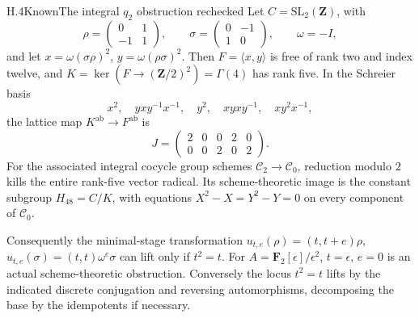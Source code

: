 \begin{statement}{H.4}{Known}{The integral $q_2$ obstruction rechecked}
Let $C=\mathrm{SL}_2(\mathbf Z)$, with
\[
 \rho=\begin{pmatrix}0&1\\-1&1\end{pmatrix},\qquad
 \sigma=\begin{pmatrix}0&-1\\1&0\end{pmatrix},\qquad
 \omega=-I,
\]
and let $x=\omega(\sigma\rho)^2$, $y=\omega(\rho\sigma)^2$.
Then $F=\langle x,y\rangle$ is free of rank two and index twelve,
and $K=\ker(F\to(\mathbf Z/2)^2)=\Gamma(4)$ has rank five.
In the Schreier basis
\[
 x^2,\quad yxy^{-1}x^{-1},\quad y^2,\quad
 xyxy^{-1},\quad xy^2x^{-1},
\]
the lattice map $K^{\mathrm{ab}}\to F^{\mathrm{ab}}$ is
\[
       J=\begin{pmatrix}2&0&0&2&0\\0&0&2&0&2\end{pmatrix}.
\]
For the associated integral cocycle group schemes
$\mathscr C_2\to\mathscr C_0$, reduction modulo $2$ kills the
entire rank-five vector radical. Its scheme-theoretic image is the
constant subgroup $H_{48}=C/K$, with equations
$X^2-X=Y^2-Y=0$ on every component of $\mathscr C_0$.

Consequently the minimal-stage transformation
$u_{t,e}(\rho)=(t,t+e)\rho$,
$u_{t,e}(\sigma)=(t,t)\omega^e\sigma$ can lift only if
$t^2=t$. For $A=\mathbf F_2[\epsilon]/\epsilon^2$,
$t=\epsilon$, $e=0$ is an actual scheme-theoretic obstruction.
Conversely the locus $t^2=t$ lifts by the indicated discrete
conjugation and reversing automorphisms, decomposing the base by
the idempotents if necessary.
\end{statement}
